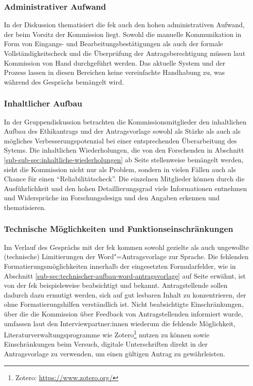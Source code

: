 \documentclass[a4paper,12pt,twoside]{scrreprt}
\begin{document}
\subsubsection*{Administrativer Aufwand}
\label{sub-sub-sec:administrativer-aufwand}

In der Diskussion thematisiert die \ac{fek} auch den hohen administrativen Aufwand, der beim Vorsitz der Kommission liegt. Sowohl die manuelle Kommunikation in Form von Eingangs- und Bearbeitungsbestätigungen als auch der formale Vollständigkeitscheck und die Überprüfung der Antragsberechtigung müssen laut Kommission von Hand durchgeführt werden. Das aktuelle System und der Prozess lassen in diesen Bereichen keine vereinfachte Handhabung zu, was während des Gesprächs bemängelt wird.

\subsubsection*{Inhaltlicher Aufbau}
\label{sub-sub-sec:inhaltlicher-aufbau}

In der Gruppendiskussion betrachten die Kommissionsmitglieder den inhaltlichen Aufbau des Ethikantrags und der Antragsvorlage sowohl als Stärke als auch als mögliches Verbesserungspotenzial bei einer entsprechenden Überarbeitung des Sytems. Die inhaltlichen Wiederholungen, die von den Forschenden in Abschnitt \ref{sub-sub-sec:inhaltliche-wiederholungen} ab Seite \pageref{sub-sub-sec:inhaltliche-wiederholungen} stellenweise bemängelt werden, sieht die Kommission nicht nur als Problem, sondern in vielen Fällen auch als Chance für einen \enquote{Reliabilitätscheck}. Die einzelnen Mitglieder können durch die Ausführlichkeit und den hohen Detaillierungsgrad viele Informationen entnehmen und Widersprüche im Forschungsdesign und den Angaben erkennen und thematisieren.

\subsubsection*{Technische Möglichkeiten und Funktionseinschränkungen }
\label{sub-sub-sec:möglichkeiten-funktionseinschränkungen}

Im Verlauf des Gesprächs mit der \acl{fek} kommen sowohl gezielte als auch ungewollte (technische) Limitierungen der Word"=Antragsvorlage zur Sprache. Die fehlenden Formatierungsmöglichkeiten innerhalb der eingesetzten Formularfelder, wie in Abschnitt \ref{sub-sec:technischer-aufbau-word-antragsvorlage} auf Seite \pageref{sub-sec:technischer-aufbau-word-antragsvorlage} erwähnt, ist von der \ac{fek} beispielsweise beabsichtigt und bekannt. Antragstellende sollen dadurch dazu ermutigt werden, sich auf gut lesbaren Inhalt zu konzentrieren, der ohne Formatierungshilfen verständlich ist. Nicht beabsichtigte Einschränkungen, über die die Kommission über Feedback von Antragstellenden informiert wurde, umfassen laut den Interviewpartner:innen wiederum die fehlende Möglichkeit, Literaturverwaltungsprogramme wie Zotero\footnote{Zotero: \url{https://www.zotero.org/}} nutzen zu können sowie Einschränkungen beim Versuch, digitale Unterschriften direkt in der Antragsvorlage zu verwenden, um einen gültigen Antrag zu gewährleisten.
\end{document}
